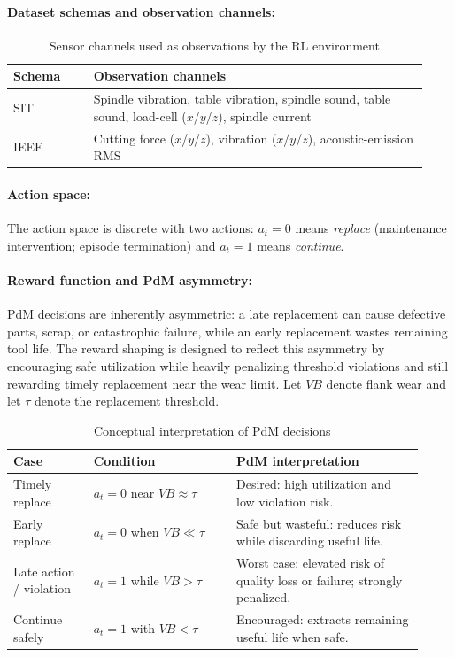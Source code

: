 \documentclass[sn-basic]{sn-jnl} %
\begin{document}
\paragraph{Dataset schemas and observation channels:}
\begin{table}[htbp]
\centering
\caption{Sensor channels used as observations by the RL environment}
\label{tab:schema_features}
	\begin{tabular}{L{0.18\linewidth} L{0.75\linewidth}}
	\toprule
	\textbf{Schema} & \textbf{Observation channels}\\
	\midrule
	SIT & Spindle vibration, table vibration, spindle sound, table sound, load-cell ($x$/$y$/$z$), spindle current\\
	IEEE & Cutting force ($x$/$y$/$z$), vibration ($x$/$y$/$z$), acoustic-emission RMS\\
	\bottomrule
	\end{tabular}
\end{table}

\paragraph{Action space:}
The action space is discrete with two actions: $a_t=0$ means \emph{replace} (maintenance intervention; episode termination) and $a_t=1$ means \emph{continue}. 

\paragraph{Reward function and PdM asymmetry:}
PdM decisions are inherently asymmetric: a late replacement can cause defective parts, scrap, or catastrophic failure, while an early replacement wastes remaining tool life. The reward shaping is designed to reflect this asymmetry by encouraging safe utilization while heavily penalizing threshold violations and still rewarding timely replacement near the wear limit. Let $VB$ denote flank wear and let $\tau$ denote the replacement threshold.

\begin{table}[htbp]
	\centering
	\caption{Conceptual interpretation of PdM decisions}
	\label{tab:cost_view}
	\begin{tabular}{L{0.18\linewidth} L{0.32\linewidth} L{0.42\linewidth}}
		\toprule
		\textbf{Case} & \textbf{Condition} & \textbf{PdM interpretation}\\
		\midrule
		Timely replace & $a_t=0$ near $VB\approx\tau$ & Desired: high utilization and low violation risk.\\
		Early replace & $a_t=0$ when $VB\ll\tau$ & Safe but wasteful: reduces risk while discarding useful life.\\
		Late action / violation & $a_t=1$ while $VB>\tau$ & Worst case: elevated risk of quality loss or failure; strongly penalized.\\
		Continue safely & $a_t=1$ with $VB<\tau$ & Encouraged: extracts remaining useful life when safe.\\
		\bottomrule
	\end{tabular}
\end{table}
\end{document}
